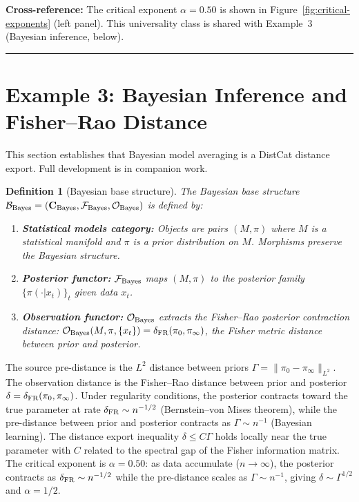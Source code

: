 \documentclass[
]{article}
\newtheorem{definition}[theorem]{Definition}
\begin{document}
\textbf{Cross-reference:} The critical exponent $\alpha = 0.50$ is shown in Figure~\ref{fig:critical-exponents} (left panel). This universality class is shared with Example~3 (Bayesian inference, below).

\begin{center}\rule{0.5\linewidth}{0.5pt}\end{center}


\section{Example 3: Bayesian Inference and Fisher--Rao Distance}\label{sec:example3-bayesian}

This section establishes that Bayesian model averaging is a DistCat distance export. Full development is in companion work.

\begin{definition}[Bayesian base structure]\label{def:base-bayesian}
The Bayesian base structure $\mathcal{B}_{\rm Bayes} = (\mathbf{C}_{\rm Bayes}, \mathcal{F}_{\rm Bayes}, \mathcal{O}_{\rm Bayes})$ is defined by:
\begin{enumerate}
\item \textbf{Statistical models category:} Objects are pairs $(M, \pi)$ where $M$ is a statistical manifold and $\pi$ is a prior distribution on $M$. Morphisms preserve the Bayesian structure.
\item \textbf{Posterior functor:} $\mathcal{F}_{\rm Bayes}$ maps $(M, \pi)$ to the posterior family $\{\pi(\cdot | x_t)\}_t$ given data $x_t$.
\item \textbf{Observation functor:} $\mathcal{O}_{\rm Bayes}$ extracts the Fisher--Rao posterior contraction distance: $\mathcal{O}_{\rm Bayes}(M, \pi, \{x_t\}) = \delta_{\rm FR}(\pi_0, \pi_\infty)$, the Fisher metric distance between prior and posterior.
\end{enumerate}
\end{definition}

The source pre-distance is the $L^2$ distance between priors $\Gamma = \|\pi_0 - \pi_\infty\|_{L^2}$. The observation distance is the Fisher--Rao distance between prior and posterior $\delta = \delta_{\rm FR}(\pi_0, \pi_\infty)$. Under regularity conditions, the posterior contracts toward the true parameter at rate $\delta_{\rm FR} \sim n^{-1/2}$ (Bernstein--von Mises theorem), while the pre-distance between prior and posterior contracts as $\Gamma \sim n^{-1}$ (Bayesian learning). The distance export inequality $\delta \leq C\Gamma$ holds locally near the true parameter with $C$ related to the spectral gap of the Fisher information matrix. The critical exponent is $\alpha = 0.50$: as data accumulate ($n \to \infty$), the posterior contracts as $\delta_{\rm FR} \sim n^{-1/2}$ while the pre-distance scales as $\Gamma \sim n^{-1}$, giving $\delta \sim \Gamma^{1/2}$ and $\alpha = 1/2$.
\end{document}

